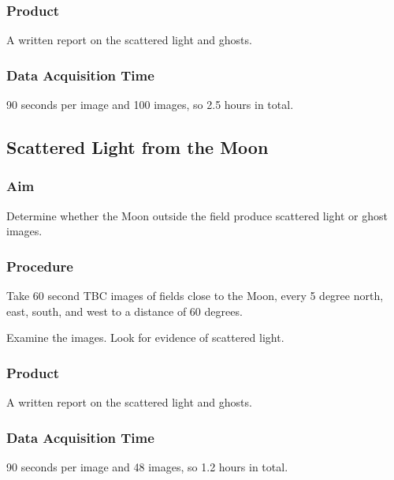 \documentclass{article}
\begin{document}
\subsubsection{Product}

A written report on the scattered light and ghosts.

\subsubsection{Data Acquisition Time}

90 seconds per image and 100 images, so 2.5 hours in total.


\subsection{Scattered Light from the Moon}

\subsubsection{Aim}

Determine whether the Moon outside the field produce scattered light or ghost images.

\subsubsection{Procedure}

Take 60 second TBC images of fields close to the Moon, every 5 degree north, east, south, and west to a distance of 60 degrees.

Examine the images. Look for evidence of scattered light.

\subsubsection{Product}

A written report on the scattered light and ghosts.

\subsubsection{Data Acquisition Time}

90 seconds per image and 48 images, so 1.2 hours in total.

\end{document}

